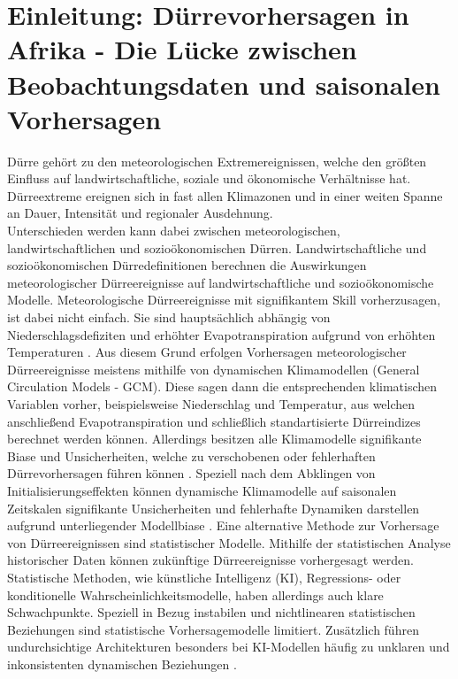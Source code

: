 \documentclass[ba-expose-lentz.tex]{subfile}
\begin{document}
{\let\clearpage\relax \chapter{Einleitung: Dürrevorhersagen in Afrika - Die Lücke zwischen Beobachtungsdaten und saisonalen Vorhersagen}}\label{einleitung}

\noindent Dürre gehört zu den meteorologischen Extremereignissen, welche den größten Einfluss auf landwirtschaftliche, soziale und ökonomische Verhältnisse hat.
Dürreextreme ereignen sich in fast allen Klimazonen und in einer weiten Spanne an Dauer, Intensität und regionaler Ausdehnung. \\
Unterschieden werden kann dabei zwischen meteorologischen, landwirtschaftlichen und sozioökonomischen Dürren.
Landwirtschaftliche und sozioökonomischen Dürredefinitionen berechnen die Auswirkungen meteorologischer Dürreereignisse auf landwirtschaftliche und sozioökonomische Modelle.
Meteorologische Dürreereignisse mit signifikantem Skill vorherzusagen, ist dabei nicht einfach.
Sie sind hauptsächlich abhängig von Niederschlagsdefiziten und erhöhter Evapotranspiration aufgrund von erhöhten Temperaturen \parencite{hao_seasonal_2018}.
Aus diesem Grund erfolgen Vorhersagen meteorologischer Dürreereignisse meistens mithilfe von dynamischen Klimamodellen (General Circulation Models - GCM).
Diese sagen dann die entsprechenden klimatischen Variablen vorher, beispielsweise Niederschlag und Temperatur, aus welchen anschließend Evapotranspiration und schließlich standartisierte Dürreindizes berechnet werden können.
Allerdings besitzen alle Klimamodelle signifikante Biase und Unsicherheiten, welche zu verschobenen oder fehlerhaften Dürrevorhersagen führen können \parencite{wu_dynamic-lstm_2022}.
Speziell nach dem Abklingen von Initialisierungseffekten können dynamische Klimamodelle auf saisonalen Zeitskalen signifikante Unsicherheiten und fehlerhafte Dynamiken darstellen aufgrund unterliegender Modellbiase \parencite{wu_dynamic-lstm_2022}.
Eine alternative Methode zur Vorhersage von Dürreereignissen sind statistischer Modelle.
Mithilfe der statistischen Analyse historischer Daten können zukünftige Dürreereignisse vorhergesagt werden.
Statistische Methoden, wie künstliche Intelligenz (KI), Regressions- oder konditionelle Wahrscheinlichkeitsmodelle, haben allerdings auch klare Schwachpunkte.
Speziell in Bezug instabilen und nichtlinearen statistischen Beziehungen sind statistische Vorhersagemodelle limitiert.
Zusätzlich führen undurchsichtige Architekturen besonders bei KI-Modellen häufig zu unklaren und inkonsistenten dynamischen Beziehungen \parencite{hao_seasonal_2018}.
\end{document}
